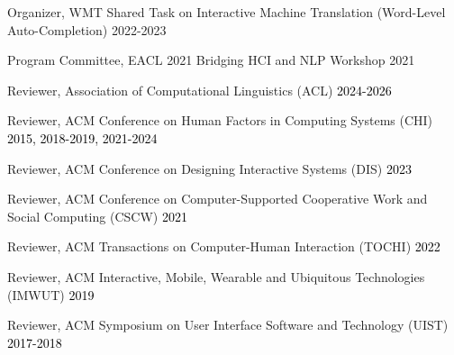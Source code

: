 

\vspace{1mm}


\vspace{-3mm}





\thispagestyle{secondstyle}




Organizer, WMT Shared Task on Interactive Machine Translation (Word-Level Auto-Completion) \hfill 2022-2023

Program Committee, EACL 2021 Bridging HCI and NLP Workshop \hfill 2021

Reviewer, Association of Computational Linguistics (ACL) \hfill \textcolor{black}{2024-2026}

Reviewer, ACM Conference on Human Factors in Computing Systems (CHI) \hfill \textcolor{black}{2015, 2018-2019, 2021-2024}

Reviewer, ACM Conference on Designing Interactive Systems (DIS) \hfill \textcolor{black}{2023}

Reviewer, ACM Conference on Computer-Supported Cooperative Work and Social Computing (CSCW) \hfill \textcolor{black}{2021}

Reviewer, ACM Transactions on Computer-Human Interaction (TOCHI) \hfill \textcolor{black}{2022}

Reviewer, ACM Interactive, Mobile, Wearable and Ubiquitous Technologies (IMWUT) \hfill \textcolor{black}{2019}

Reviewer, ACM Symposium on User Interface Software and Technology (UIST) \hfill \textcolor{black}{2017-2018}\\

% 




